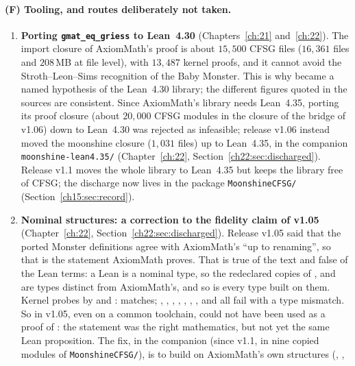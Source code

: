 \paragraph{(F) Tooling, and routes deliberately not taken.}
\begin{enumerate}
\item \textbf{Porting \texttt{gmat\_eq\_griess} to Lean~4.30} (Chapters~\ref{ch:21} and~\ref{ch:22}). The import closure of
  AxiomMath's proof is about $15{,}500$ CFSG files ($16{,}361$ files and $208$\,MB at file level), with $13{,}487$ kernel
   proofs, and it cannot avoid the Stroth--Leon--Sims recognition of the Baby Monster. This is why
   became a named hypothesis of the Lean~4.30 library; the different figures quoted in the sources are
  consistent. Since AxiomMath's library needs Lean~4.35, porting its proof closure (about $20{,}000$ CFSG modules in the closure
  of the bridge of v1.06) down to Lean~4.30 was rejected as infeasible; release v1.06 instead moved the moonshine closure
  ($1{,}031$ files) up to Lean~4.35, in the companion \texttt{moonshine-lean4.35/} (Chapter~\ref{ch:22},
  Section~\ref{ch22:sec:discharged}). Release v1.1 moves the whole library to Lean~4.35 but keeps the library free of
  CFSG; the discharge now lives in the package \texttt{MoonshineCFSG/} (Section~\ref{ch15:sec:record}).
\item \textbf{Nominal structures: a correction to the fidelity claim of v1.05} (Chapter~\ref{ch:22},
  Section~\ref{ch22:sec:discharged}). Release v1.05 said that the ported Monster definitions agree with AxiomMath's ``up
  to renaming'', so that  is the statement AxiomMath proves. That is true of the text and false of the
  Lean terms: a Lean  is a nominal type, so the redeclared copies of ,  and
   are types distinct from AxiomMath's, and so is every type built on them. Kernel probes by  and
  :  matches; , , , ,
  , , ,  and  all fail with a type mismatch.
  So in v1.05, even on a common toolchain,  could not have been used as a proof of
  : the statement was the right mathematics, but not yet the same Lean proposition. The fix, in the
  companion (since v1.1, in nine copied modules of \texttt{MoonshineCFSG/}), is to build on AxiomMath's own structures (, ,

\end{enumerate}
